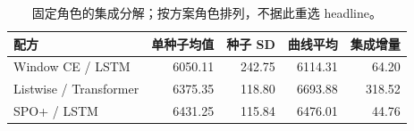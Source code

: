 \begin{table}[!htbp]
\centering\small
\caption{固定角色的集成分解；按方案角色排列，不据此重选 headline。}\label{tab:bags}
\begin{tabularx}{\linewidth}{@{}Xrrrr@{}}
\toprule
配方 & 单种子均值 & 种子 SD & 曲线平均 & 集成增量 \\
\midrule
Window CE / LSTM & 6050.11 & 242.75 & 6114.31 & 64.20 \\
Listwise / Transformer & 6375.35 & 118.80 & 6693.88 & 318.52 \\
SPO+ / LSTM & 6431.25 & 115.84 & 6476.01 & 44.76 \\
\bottomrule
\end{tabularx}
\par\vspace{3pt}{\footnotesize 每条配方均为种子 42--46。单种子 SD 描述这五次训练的离散度，不是时间泛化误差。}
\end{table}

